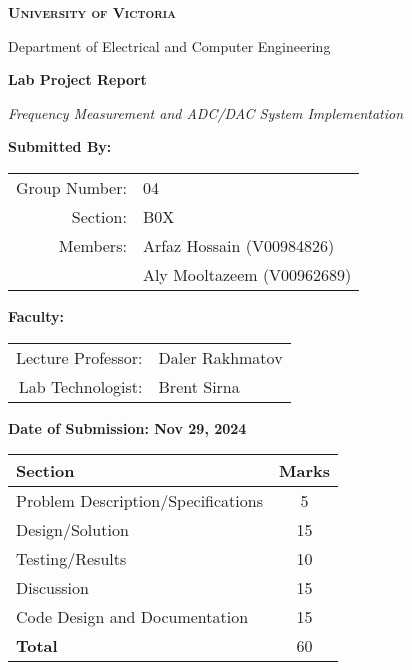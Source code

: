 \begin{titlepage}
\begin{center}

{\Large\bfseries\scshape University of Victoria \par}
{\large Department of Electrical and Computer Engineering \par}
\vspace{1.5cm}

{\Huge\bfseries Lab Project Report \par}
\vspace{0.4cm}
{\LARGE\textit{Frequency Measurement and ADC/DAC System Implementation} \par}
\vspace{1.2cm}

{\large\bfseries Submitted By: \par}
\vspace{0.4cm}
\begin{tabular}{rl}
Group Number: & 04 \\
Section: & B0X \\
Members: & Arfaz Hossain (V00984826) \\
         & Aly Mooltazeem (V00962689) \\
\end{tabular}
\vspace{1cm}

{\large\bfseries Faculty: \par}
\vspace{0.4cm}
\begin{tabular}{rl}
Lecture Professor: & Daler Rakhmatov \\
Lab Technologist: & Brent Sirna \\
\end{tabular}
\vspace{1cm}

{\large\bfseries Date of Submission: Nov 29, 2024 \par}
\vspace{1.5cm}

\begin{tabular}{|p{8cm}|c|}
\hline
\textbf{Section} & \textbf{Marks} \\
\hline
Problem Description/Specifications & 5 \\
Design/Solution & 15 \\
Testing/Results & 10 \\
Discussion & 15 \\
Code Design and Documentation & 15 \\
\hline
\textbf{Total} & 60 \\
\hline
\end{tabular}

\end{center}
\end{titlepage}
